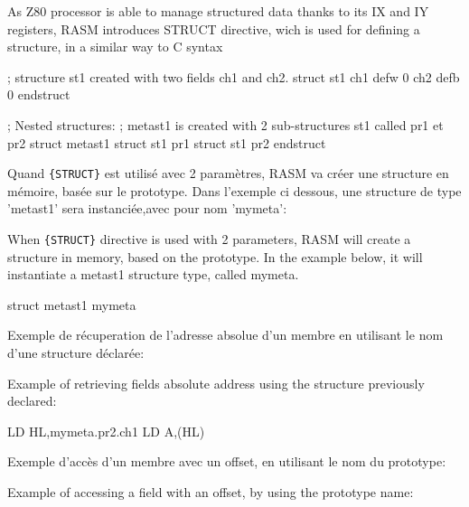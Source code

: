 \begin{xen}
As Z80 processor is able to manage structured data thanks to its IX and IY registers, RASM introduces STRUCT directive, wich is used for defining a structure, in a similar way to C syntax
\end{xen}

\begin{code}
; structure st1 created with two fields ch1 and ch2.
struct st1
 ch1 defw 0
 ch2 defb 0
endstruct

; Nested structures:
; metast1 is created with 2 sub-structures st1 called pr1 et pr2
struct metast1
 struct st1 pr1
 struct st1 pr2
endstruct
\end{code}

\begin{xfr}
Quand \texttt{\{STRUCT\}} est utilisé avec 2 paramètres, RASM va créer une structure en mémoire, basée sur le prototype.
Dans l'exemple ci dessous, une structure de type 'metast1' sera instanciée,avec pour nom 'mymeta':
\end{xfr}

\begin{xen}
When \texttt{\{STRUCT\}} directive is used with 2 parameters, RASM will create a structure in memory, based on the prototype.
In the example below, it will instantiate a metast1 structure type, called mymeta.
\end{xen}

\begin{code}
struct metast1 mymeta
\end{code}

\begin{xfr}
Exemple de récuperation de l'adresse absolue d'un membre en utilisant le nom d'une structure déclarée:
\end{xfr}

\begin{xen}
Example of retrieving fields absolute address using the structure previously declared:
\end{xen}

\begin{code}
LD HL,mymeta.pr2.ch1
LD A,(HL)
\end{code}

\begin{xfr}
Exemple d'accès d'un membre avec un offset, en utilisant le nom du prototype:
\end{xfr}
\begin{xen}
Example of accessing a field with an offset, by using the prototype name:
\end{xen}

